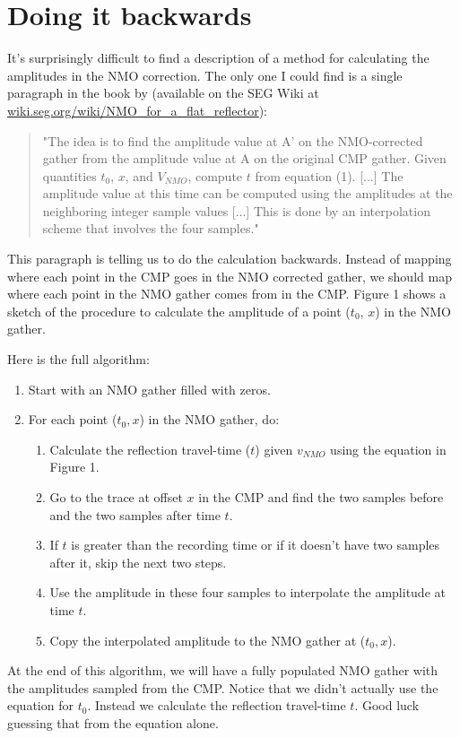 \section{Doing it backwards}

It's surprisingly difficult to find a description of a method for calculating
the amplitudes in the NMO correction.
The only one I could find is a single paragraph in the book by
\citet{Yilmaz_2001} (available on the SEG Wiki at
\href{http://wiki.seg.org/wiki/NMO_for_a_flat_reflector}{wiki.seg.org/wiki/NMO\_for\_a\_flat\_reflector}):

\begin{quotation}
"The idea is to find the amplitude value at A' on the NMO-corrected gather from the amplitude value at A on the original CMP gather. Given quantities $t_0$, $x$, and $V_{NMO}$, compute $t$ from equation (1). [...] The amplitude value at this time can be computed using the amplitudes at the neighboring integer sample values [...] This is done by an interpolation scheme that involves the four samples."
\end{quotation}

This paragraph is telling us to do the calculation backwards.
Instead of mapping where each point in the CMP goes in the NMO corrected
gather, we should map where each point in the NMO gather comes from in the CMP.
Figure 1 shows a sketch of the procedure to calculate the amplitude of a point
($t_0$, $x$) in the NMO gather.

Here is the full algorithm:

\begin{enumerate}
    \item Start with an NMO gather filled with zeros.
    \item For each point ($t_0, x$) in the NMO gather, do:
    \begin{enumerate}
        \item Calculate the reflection travel-time ($t$) given $v_{NMO}$ using
              the equation in Figure 1.
        \item Go to the trace at offset $x$ in the CMP and find the two samples
              before and the two samples after time $t$.
        \item If $t$ is greater than the recording time or if it doesn't have
              two samples after it, skip the next two steps.
        \item Use the amplitude in these four samples to interpolate the
              amplitude at time $t$.
        \item Copy the interpolated amplitude to the NMO gather at ($t_0, x$).
    \end{enumerate}
\end{enumerate}

At the end of this algorithm, we will have a fully populated NMO gather with
the amplitudes sampled from the CMP.
Notice that we didn't actually use the equation for $t_0$.
Instead we calculate the reflection travel-time $t$.
Good luck guessing that from the equation alone.
